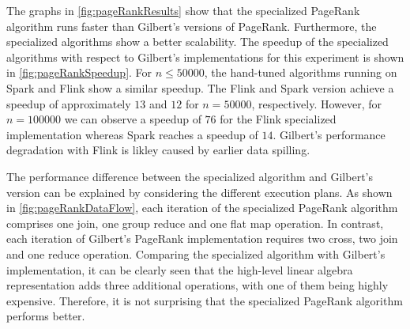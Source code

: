 The graphs in \cref{fig:pageRankResults} show that the specialized PageRank algorithm runs faster than Gilbert's versions of PageRank.
Furthermore, the specialized algorithms show a better scalability.
The speedup of the specialized algorithms with respect to Gilbert's implementations for this experiment is shown in \cref{fig:pageRankSpeedup}.
For $n\le 50000$, the hand-tuned algorithms running on Spark and Flink show a similar speedup.
The Flink and Spark version achieve a speedup of approximately $13$ and $12$ for $n=50000$, respectively.
However, for $n = 100000$ we can observe a speedup of $76$ for the Flink specialized implementation whereas Spark reaches a speedup of $14$.
Gilbert's performance degradation with Flink is likley caused by earlier data spilling.

The performance difference between the specialized algorithm and Gilbert's version can be explained by considering the different execution plans.
As shown in \cref{fig:pageRankDataFlow}, each iteration of the specialized PageRank algorithm comprises one join, one group reduce and one flat map operation.
In contrast, each iteration of Gilbert's PageRank implementation requires two cross, two join and one reduce operation.
Comparing the specialized algorithm with Gilbert's implementation, it can be clearly seen that the high-level linear algebra representation adds three additional operations, with one of them being highly expensive.
Therefore, it is not surprising that the specialized PageRank algorithm performs better.

